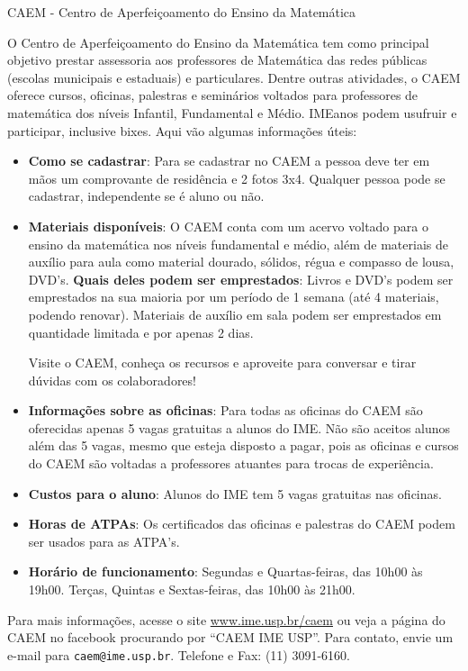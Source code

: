\begin{secao}{CAEM - Centro de Aperfeiçoamento do Ensino da Matemática}

O Centro de Aperfeiçoamento do Ensino da Matemática tem como principal
objetivo prestar assessoria aos professores de Matemática das redes
públicas (escolas municipais e estaduais) e particulares. Dentre
outras atividades, o CAEM oferece cursos, oficinas, palestras e
seminários voltados para professores de matemática dos níveis
Infantil, Fundamental e Médio. IMEanos podem usufruir e participar,
inclusive bixes. Aqui vão algumas informações úteis:


\begin{itemize}

\item \textbf{Como se cadastrar}: Para se cadastrar no CAEM a pessoa
  deve ter em mãos um comprovante de residência e 2 fotos
  3x4. Qualquer pessoa pode se cadastrar, independente se é aluno ou
  não.

\item \textbf{Materiais disponíveis}: O CAEM conta com um acervo
  voltado para o ensino da matemática nos níveis fundamental e médio,
  além de materiais de auxílio para aula como material dourado,
  sólidos, régua e compasso de lousa, DVD's. \textbf{Quais deles podem
    ser emprestados}: Livros e DVD's podem ser emprestados na sua
  maioria por um período de 1 semana (até 4 materiais, podendo
  renovar). Materiais de auxílio em sala podem ser emprestados em
  quantidade limitada e por apenas 2 dias. 
  
  Visite o CAEM, conheça os recursos e aproveite para conversar e
  tirar dúvidas com os colaboradores!   

\item \textbf{Informações sobre as oficinas}: Para todas as oficinas
  do CAEM são oferecidas apenas 5 vagas gratuitas a alunos do IME. Não
  são aceitos alunos além das 5 vagas, mesmo que esteja disposto a
  pagar, pois as oficinas e cursos do CAEM são voltadas a professores
  atuantes para trocas de experiência.

\item \textbf{Custos para o aluno}: Alunos do IME tem 5 vagas
  gratuitas nas oficinas.

\item \textbf{Horas de ATPAs}: Os certificados das oficinas e palestras
 do CAEM podem ser usados para as ATPA's.

\item \textbf{Horário de funcionamento}: Segundas e Quartas-feiras,
  das 10h00 às 19h00. Terças, Quintas e Sextas-feiras, das 10h00 às
  21h00.
\end{itemize}

Para mais informações, acesse o site \url{www.ime.usp.br/caem} ou veja
a página do CAEM no facebook procurando por ``CAEM IME USP''. Para
contato, envie um e-mail para {\tt caem@ime.usp.br}. Telefone e Fax:
(11) 3091-6160.


\end{secao}
